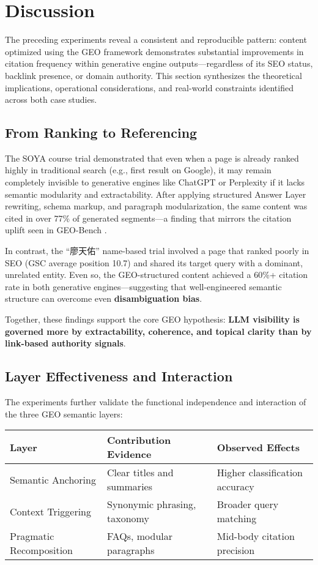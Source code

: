 \section{Discussion}

The preceding experiments reveal a consistent and reproducible pattern: content optimized using the GEO framework demonstrates substantial improvements in citation frequency within generative engine outputs---regardless of its SEO status, backlink presence, or domain authority. This section synthesizes the theoretical implications, operational considerations, and real-world constraints identified across both case studies.

\subsection{From Ranking to Referencing}

The SOYA course trial demonstrated that even when a page is already ranked highly in traditional search (e.g., first result on Google), it may remain completely invisible to generative engines like ChatGPT or Perplexity if it lacks semantic modularity and extractability. After applying structured Answer Layer rewriting, schema markup, and paragraph modularization, the same content was cited in over 77\% of generated segments---a finding that mirrors the citation uplift seen in GEO-Bench \cite{aggarwal2024geo}.

In contrast, the “廖天佑” name-based trial involved a page that ranked poorly in SEO (GSC average position 10.7) and shared its target query with a dominant, unrelated entity. Even so, the GEO-structured content achieved a 60\%+ citation rate in both generative engines---suggesting that well-engineered semantic structure can overcome even \textbf{disambiguation bias}.

Together, these findings support the core GEO hypothesis: \textbf{LLM visibility is governed more by extractability, coherence, and topical clarity than by link-based authority signals}.

\subsection{Layer Effectiveness and Interaction}

The experiments further validate the functional independence and interaction of the three GEO semantic layers:

\begin{center}
\begin{tabular}{|l|l|l|}
\hline
\textbf{Layer} & \textbf{Contribution Evidence} & \textbf{Observed Effects} \\\hline
Semantic Anchoring & Clear titles and summaries & Higher classification accuracy \\\hline
Context Triggering & Synonymic phrasing, taxonomy & Broader query matching \\\hline
Pragmatic Recomposition & FAQs, modular paragraphs & Mid-body citation precision \\\hline
\end{tabular}
\end{center}

